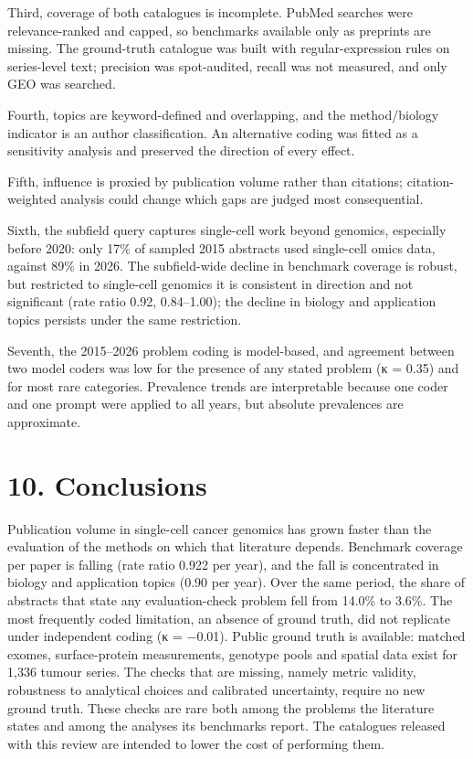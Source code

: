 \documentclass[11pt]{article}
\begin{document}
Third, coverage of both catalogues is incomplete. PubMed searches were
relevance-ranked and capped, so benchmarks available only as preprints
are missing. The ground-truth catalogue was built with
regular-expression rules on series-level text; precision was
spot-audited, recall was not measured, and only GEO was searched.

Fourth, topics are keyword-defined and overlapping, and the
method/biology indicator is an author classification. An alternative
coding was fitted as a sensitivity analysis and preserved the direction
of every effect.

Fifth, influence is proxied by publication volume rather than citations;
citation-weighted analysis could change which gaps are judged most
consequential.

Sixth, the subfield query captures single-cell work beyond genomics,
especially before 2020: only 17\% of sampled 2015 abstracts used
single-cell omics data, against 89\% in 2026. The subfield-wide decline
in benchmark coverage is robust, but restricted to single-cell genomics
it is consistent in direction and not significant (rate ratio 0.92,
0.84--1.00); the decline in biology and application topics persists
under the same restriction.

Seventh, the 2015--2026 problem coding is model-based, and agreement
between two model coders was low for the presence of any stated problem
(κ = 0.35) and for most rare categories. Prevalence trends are
interpretable because one coder and one prompt were applied to all
years, but absolute prevalences are approximate.

\section{10. Conclusions}\label{conclusions}

Publication volume in single-cell cancer genomics has grown faster than
the evaluation of the methods on which that literature depends.
Benchmark coverage per paper is falling (rate ratio 0.922 per year), and
the fall is concentrated in biology and application topics (0.90 per
year). Over the same period, the share of abstracts that state any
evaluation-check problem fell from 14.0\% to 3.6\%. The most frequently
coded limitation, an absence of ground truth, did not replicate under
independent coding (κ = −0.01). Public ground truth is available:
matched exomes, surface-protein measurements, genotype pools and spatial
data exist for 1,336 tumour series. The checks that are missing, namely
metric validity, robustness to analytical choices and calibrated
uncertainty, require no new ground truth. These checks are rare both
among the problems the literature states and among the analyses its
benchmarks report. The catalogues released with this review are intended
to lower the cost of performing them.
\end{document}
